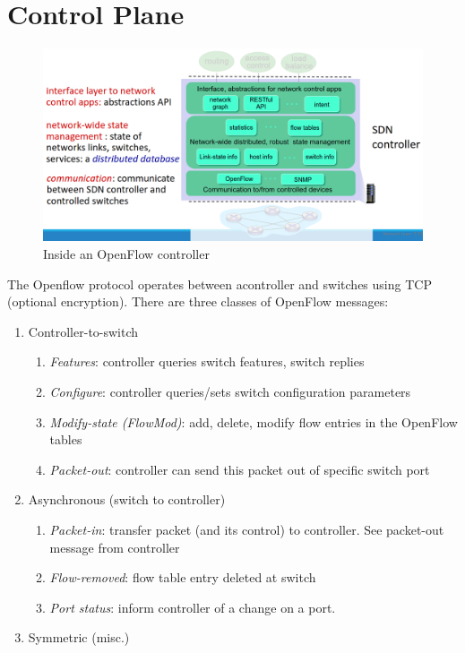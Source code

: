 \section{Control Plane}
\begin{figure}[htbp]
   \centering
   \includegraphics{images/openflow_controllerinside.png}
   \caption{Inside an OpenFlow controller}
   \label{fig:openflow_controllerinside}
\end{figure}
The Openflow protocol operates between acontroller and switches using TCP (optional encryption). There are three classes of OpenFlow messages:
\begin{enumerate}
   \item Controller-to-switch
   \begin{enumerate}
      \item \textit{Features}:
      controller queries switch features, switch replies
      \item \textit{Configure}:
      controller queries/sets switch configuration parameters
      \item \textit{Modify-state (FlowMod)}:
      add, delete, modify flow entries in the OpenFlow
      tables
      \item \textit{Packet-out}:
      controller can send this packet out of specific switch port
   \end{enumerate}
   \item Asynchronous (switch to controller) 
   \begin{enumerate}
      \item \textit{Packet-in}:
      transfer packet (and its control) to controller. See packet-out message from controller
      \item \textit{Flow-removed}:
      flow table entry deleted at switch
      \item \textit{Port status}:
      inform controller of a change on a port.
   \end{enumerate}
   \item Symmetric (misc.)
\end{enumerate} 


